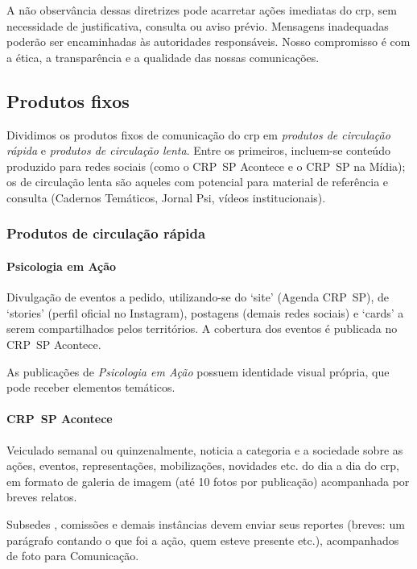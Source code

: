 A não observância dessas diretrizes pode acarretar ações imediatas do \ac{crp}, sem necessidade de justificativa, consulta ou aviso prévio. Mensagens inadequadas poderão ser encaminhadas às autoridades responsáveis. Nosso compromisso é com a ética, a transparência e a qualidade das nossas comunicações.

\subsection{Produtos fixos}

Dividimos os produtos fixos de comunicação do \ac{crp} em \emph{produtos de circulação rápida} e \emph{produtos de circulação lenta}. Entre os primeiros, incluem-se conteúdo produzido para redes sociais (como o CRP~SP Acontece e o CRP~SP na Mídia); os de circulação lenta são aqueles com potencial para material de referência e consulta (Cadernos Temáticos, Jornal Psi, vídeos institucionais).

\subsubsection{Produtos de circulação rápida}

\paragraph{Psicologia em Ação}

Divulgação de eventos a pedido, utilizando-se do `site' (Agenda CRP~SP), de `stories' (perfil oficial no Instagram), postagens (demais redes sociais) e `cards' a serem compartilhados pelos territórios. A cobertura dos eventos é publicada no CRP~SP Acontece.

As publicações de \emph{Psicologia em Ação} possuem identidade visual própria, que pode receber elementos temáticos.

\paragraph{CRP~SP Acontece}

Veiculado semanal ou quinzenalmente, noticia a categoria e a sociedade sobre as ações, eventos, representações, mobilizações, novidades etc. do dia a dia do \ac{crp}, em formato de galeria de imagem (até 10 fotos por publicação) acompanhada por breves relatos.

Subsedes , comissões e demais instâncias devem enviar seus reportes (breves: um parágrafo contando o que foi a ação, quem esteve presente etc.), acompanhados de foto para Comunicação.

